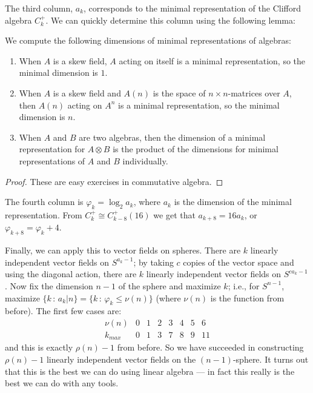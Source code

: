 The third column, $a_k$, corresponds to the minimal representation of the Clifford algebra $C_k^+$.  We can quickly determine this column using the following lemma:
\begin{lem}\label{MinRepsOfAlgs}
We compute the following dimensions of minimal representations of algebras:
\begin{enumerate}
\item When $A$ is a skew field, $A$ acting on itself is a minimal representation, so the minimal dimension is $1$.
\item When $A$ is a skew field and $A(n)$ is the space of $n \times n$-matrices over $A$, then $A(n)$ acting on $A^n$ is a minimal representation, so the minimal dimension is $n$.
\item When $A$ and $B$ are two algebras, then the dimension of a minimal representation for $A \otimes B$ is the product of the dimensions for minimal representations of $A$ and $B$ individually.
\end{enumerate}
\end{lem}
\begin{proof} These are easy exercises in commutative algebra. \end{proof}
The fourth column is $\varphi_k = \log_2 a_k$, where $a_k$ is the dimension of the minimal representation.  From $C_k^+ \cong C_{k-8}^+(16)$ we get that $a_{k+8} = 16 a_k$, or $\varphi_{k + 8} = \varphi_k + 4$.

Finally, we can apply this to vector fields on spheres.  There are $k$ linearly independent vector fields on $S^{a_k - 1}$; by taking $c$ copies of the vector space and using the diagonal action, there are $k$ linearly independent vector fields on $S^{ca_k - 1}$.  Now fix the dimension $n-1$ of the sphere and maximize $k$; i.e., for $S^{n-1}$, maximize $\{k\,:\,a_k | n\} = \{ k\,:\, \varphi_k \le \nu(n)\}$ (where $\nu(n)$ is the function from before).  The first few cases are:
\[\begin{array}{c|ccccccc}
\nu(n) & 0 & 1 & 2 & 3 & 4 & 5 & 6 \\
\hline
k_{max} & 0 & 1 & 3 & 7 & 8 & 9 & 11
\end{array}\]
and this is exactly $\rho(n) - 1$ from before.  So we have succeeded in constructing $\rho(n) - 1$ linearly independent vector fields on the $(n-1)$-sphere.  It turns out that this is the best we can do using linear algebra --- in fact this really is the best we can do with any tools.
\fi
{}

